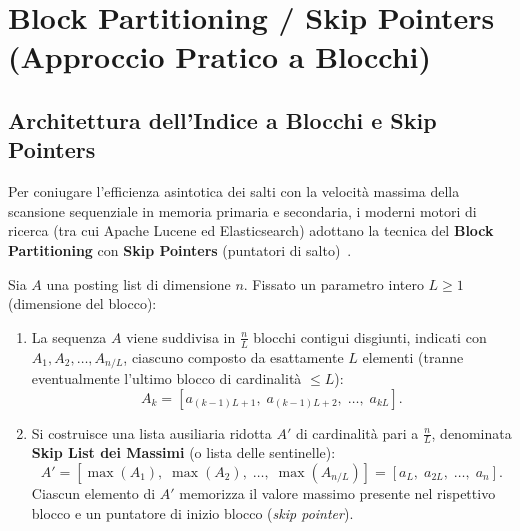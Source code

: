 \FloatBarrier
\section{Block Partitioning / Skip Pointers (Approccio Pratico a Blocchi)}
\label{sec:block-partitioning}

\subsection{Architettura dell'Indice a Blocchi e Skip Pointers}
Per coniugare l'efficienza asintotica dei salti con la velocità massima della scansione sequenziale in memoria primaria e secondaria, i moderni motori di ricerca (tra cui Apache Lucene ed Elasticsearch) adottano la tecnica del \textbf{Block Partitioning} con \textbf{Skip Pointers} (puntatori di salto)~\cite{moffat1996,manning2008}.

\begin{definition}
Sia $A$ una posting list di dimensione $n$. Fissato un parametro intero $L \ge 1$ (dimensione del blocco):
\begin{enumerate}
  \item La sequenza $A$ viene suddivisa in $\frac{n}{L}$ blocchi contigui disgiunti, indicati con $A_1, A_2, \dots, A_{n/L}$, ciascuno composto da esattamente $L$ elementi (tranne eventualmente l'ultimo blocco di cardinalità $\le L$):
  \begin{equation}
    A_k = [a_{(k-1)L + 1}, \; a_{(k-1)L + 2}, \; \dots, \; a_{kL}].
  \end{equation}
  \item Si costruisce una lista ausiliaria ridotta $A'$ di cardinalità pari a $\frac{n}{L}$, denominata \textbf{Skip List dei Massimi} (o lista delle sentinelle):
  \begin{equation}
    A' = \left[\max(A_1), \; \max(A_2), \; \dots, \; \max(A_{n/L})\right] = \left[a_L, \; a_{2L}, \; \dots, \; a_n\right].
  \end{equation}
  Ciascun elemento di $A'$ memorizza il valore massimo presente nel rispettivo blocco e un puntatore di inizio blocco (\textit{skip pointer}).
\end{enumerate}
\end{definition}

